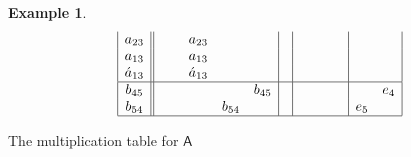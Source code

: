 \documentclass{amsart}
\newcommand{\acat}[1]{\mathsf{#1}}
\numberwithin{lstfloat}{section}
\theoremstyle{definition}
\newtheorem{ex}[thm]{Example}
\theoremstyle{remark}
\numberwithin{equation}{section}
\begin{document}
\begin{ex}
\begin{table}[h]
\begin{align*}
\begin{array}{|c||ccccc|c|cccc|cc|}
         a_{23}&   &     & a_{23}&   &     &     &     &     &     &   &   & \\
         a_{13}&   &     & a_{13}&   &     &     &     &     &     &   &   & \\
         \acute{a}_{13}&&&\acute{a}_{13}&& &     &     &     &     &   &   & \\
        \hline        
         b_{45}&   &     &     &     & b_{45}&   &     &     &     &   &   & e_4 \\
         b_{54}&   &     &     & b_{54}&   &     &     &     &     &   & e_5& \\
        \hline
    \end{array}
  \end{align*} 
\caption{The multiplication table for $\acat{A}$}\label{tab:comp-grammer-table}
\end{table}
\end{ex}
\end{document}
